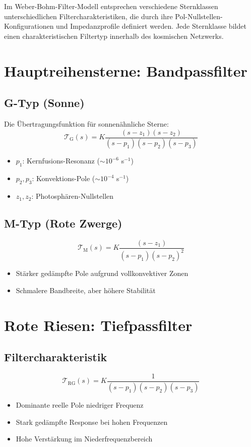 Im Weber-Bohm-Filter-Modell entsprechen verschiedene Sternklassen unterschiedlichen Filtercharakteristiken, die durch ihre Pol-Nullstellen-Konfigurationen und Impedanzprofile definiert werden. Jede Sternklasse bildet einen charakteristischen Filtertyp innerhalb des kosmischen Netzwerks.

\section{Hauptreihensterne: Bandpassfilter}

\subsection{G-Typ (Sonne)}
Die Übertragungsfunktion für sonnenähnliche Sterne:
\[
\mathcal{T}_{\text{G}}(s) = K\frac{(s - z_1)(s - z_2)}{(s - p_1)(s - p_2)(s - p_3)}
\]
\begin{itemize}
\item $p_1$: Kernfusions-Resonanz ($\sim 10^{-6}$ s$^{-1}$)
\item $p_2, p_3$: Konvektions-Pole ($\sim 10^{-4}$ s$^{-1}$)
\item $z_1, z_2$: Photosphären-Nullstellen
\end{itemize}

\subsection{M-Typ (Rote Zwerge)}
\[
\mathcal{T}_{\text{M}}(s) = K\frac{(s - z_1)}{(s - p_1)(s - p_2)^2}
\]
\begin{itemize}
\item Stärker gedämpfte Pole aufgrund vollkonvektiver Zonen
\item Schmalere Bandbreite, aber höhere Stabilität
\end{itemize}

\section{Rote Riesen: Tiefpassfilter}

\subsection{Filtercharakteristik}
\[
\mathcal{T}_{\text{RG}}(s) = K\frac{1}{(s - p_1)(s - p_2)(s - p_3)}
\]
\begin{itemize}
\item Dominante reelle Pole niedriger Frequenz
\item Stark gedämpfte Response bei hohen Frequenzen
\item Hohe Verstärkung im Niederfrequenzbereich
\end{itemize}

